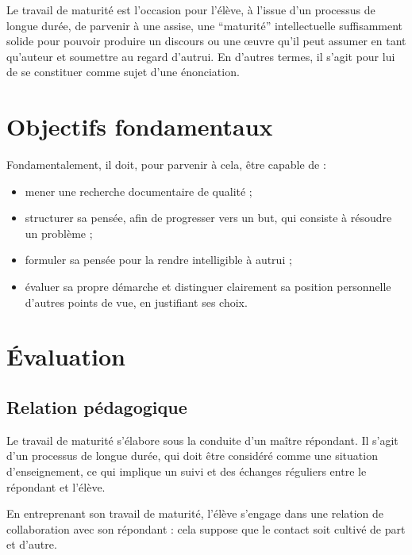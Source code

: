 \documentclass[
  10pt,
  french,
  a5paper,
  openany]{book}
\providecommand{\tightlist}{%
  \setlength{\itemsep}{0pt}\setlength{\parskip}{0pt}}
\begin{document}
Le travail de maturité est l'occasion pour l'élève, à l'issue d'un processus de longue durée, de parvenir à une assise, une ``maturité'' intellectuelle suffisamment solide pour pouvoir produire un discours ou une œuvre qu'il peut assumer en tant qu'auteur et soumettre au regard d'autrui. En d'autres termes, il s'agit pour lui de se constituer comme sujet d'une énonciation.

\hypertarget{objectifs-fondamentaux}{%
\section*{Objectifs fondamentaux}\label{objectifs-fondamentaux}}

Fondamentalement, il doit, pour parvenir à cela, être capable de :

\begin{itemize}
\tightlist
\item
  mener une recherche documentaire de qualité ;
\item
  structurer sa pensée, afin de progresser vers un but, qui consiste à résoudre un problème ;
\item
  formuler sa pensée pour la rendre intelligible à autrui ;
\item
  évaluer sa propre démarche et distinguer clairement sa position personnelle d'autres points de vue, en justifiant ses choix.
\end{itemize}

\hypertarget{uxe9valuation}{%
\section*{Évaluation}\label{uxe9valuation}}

\hypertarget{relation-puxe9dagogique}{%
\subsection*{Relation pédagogique}\label{relation-puxe9dagogique}}

Le travail de maturité s'élabore sous la conduite d'un maître répondant. Il s'agit d'un processus de longue durée, qui doit être considéré comme une situation d'enseignement, ce qui implique un suivi et des échanges réguliers entre le répondant et l'élève.

En entreprenant son travail de maturité, l'élève s'engage dans une relation de collaboration avec son répondant : cela suppose que le contact soit cultivé de part et d'autre.
\end{document}
